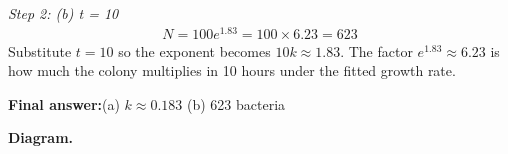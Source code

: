 \documentclass[11pt]{article}
\begin{document}
\textit{Step 2: (b) t = 10}
\[\begin{gathered}
N = 100e^{1.83} = 100 \times 6.23 = 623
\end{gathered}\]
Substitute \( t = 10 \) so the exponent becomes \( 10k \approx 1.83 \). The factor \( e^{1.83} \approx 6.23 \) is how much the colony multiplies in 10 hours under the fitted growth rate.

\begin{answerbox}
\textbf{Final answer:}\quad (a) \(\displaystyle  k \approx 0.183 \) (b) 623 bacteria
\end{answerbox}
\textbf{Diagram.}

\begin{center}
\end{center}
\end{document}
